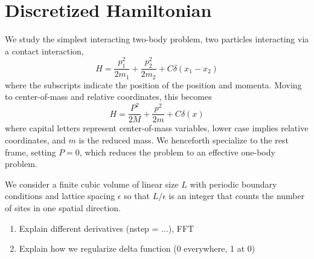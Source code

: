 \section{Discretized Hamiltonian}\label{sec:hamiltonian}

We study the simplest interacting two-body problem, two particles interacting via a contact interaction,
\begin{equation}
    H = \frac{p_1^2}{2 m_1} + \frac{p_2^2}{2 m_2} + C \delta(x_1-x_2)
\end{equation}
where the subscripts indicate the position of the position and momenta.  Moving to center-of-mass and relative coordinates, this becomes
\begin{equation}
    H = \frac{P^2}{2 M} + \frac{p^2}{2 m} + C \delta(x)
\end{equation}
where capital letters represent center-of-mass variables, lower case implies relative coordinates, and $m$ is the reduced mass.  We henceforth specialize to the rest frame, setting $P=0$, which reduces the problem to an effective one-body problem.

We consider a finite cubic volume of linear size $L$ with periodic boundary conditions and lattice spacing $\epsilon$ so that $L/\epsilon$ is an integer that counts the number of sites in one spatial direction.

\begin{enumerate}
    \item Explain different derivatives (nstep = ...), FFT
    \item Explain how we regularize delta function (0 everywhere, 1 at 0)
\end{enumerate}
